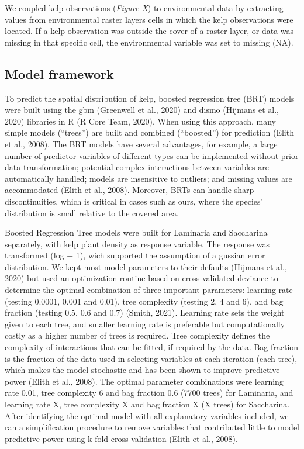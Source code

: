 \documentclass[
]{article}
\begin{document}
We coupled kelp observations (\emph{Figure X}) to environmental data by
extracting values from environmental raster layers cells in which the
kelp observations were located. If a kelp observation was outside the
cover of a raster layer, or data was missing in that specific cell, the
environmental variable was set to missing (NA).

\hypertarget{model-framework}{%
\subsection{Model framework}\label{model-framework}}

To predict the spatial distribution of kelp, boosted regression tree
(BRT) models were built using the gbm (Greenwell et al., 2020) and dismo
(Hijmans et al., 2020) libraries in R (R Core Team, 2020). When using
this approach, many simple models (``trees'') are built and combined
(``boosted'') for prediction (Elith et al., 2008). The BRT models have
several advantages, for example, a large number of predictor variables
of different types can be implemented without prior data transformation;
potential complex interactions between variables are automatically
handled; models are insensitive to outliers; and missing values are
accommodated (Elith et al., 2008). Moreover, BRTs can handle sharp
discontinuities, which is critical in cases such as ours, where the
species' distribution is small relative to the covered area.

Boosted Regression Tree models were built for Laminaria and Saccharina
separately, with kelp plant density as response variable. The response
was transformed (log + 1), wich supported the assumption of a gussian
error distribution. We kept most model parameters to their defaults
(Hijmans et al., 2020) but used an optimization routine based on
cross-validated deviance to determine the optimal combination of three
important parameters: learning rate (testing 0.0001, 0.001 and 0.01),
tree complexity (testing 2, 4 and 6), and bag fraction (testing 0.5, 0.6
and 0.7) (Smith, 2021). Learning rate sets the weight given to each
tree, and smaller learning rate is preferable but computationally costly
as a higher number of trees is required. Tree complexity defines the
complexity of interactions that can be fitted, if required by the data.
Bag fraction is the fraction of the data used in selecting variables at
each iteration (each tree), which makes the model stochastic and has
been shown to improve predictive power (Elith et al., 2008). The optimal
parameter combinations were learning rate 0.01, tree complexity 6 and
bag fraction 0.6 (7700 trees) for Laminaria, and learning rate X, tree
complexity X and bag fraction X (X trees) for Saccharina. After
identifying the optimal model with all explanatory variables included,
we ran a simplification procedure to remove variables that contributed
little to model predictive power using k-fold cross validation (Elith et
al., 2008).
\end{document}
